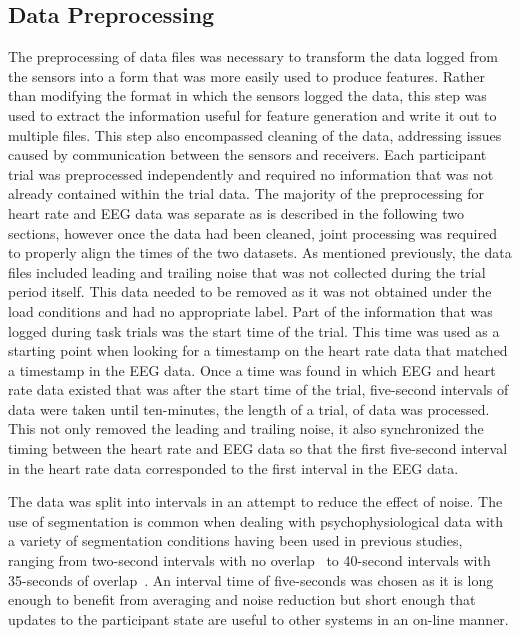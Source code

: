 \documentclass[11pt]{article}
\begin{document}
	\subsection{Data Preprocessing}
	The preprocessing of data files was necessary to transform the data logged from the sensors into a form that was more easily used to produce features. Rather than modifying the format in which the sensors logged the data, this step was used to extract the information useful for feature generation and write it out to multiple files. This step also encompassed cleaning of the data, addressing issues caused by communication between the sensors and receivers. Each participant trial was preprocessed independently and required no information that was not already contained within the trial data. The majority of the preprocessing for heart rate and EEG data was separate as is described in the following two sections, however once the data had been cleaned, joint processing was required to properly align the times of the two datasets. As mentioned previously, the data files included leading and trailing noise that was not collected during the trial period itself. This data needed to be removed as it was not obtained under the load conditions and had no appropriate label. Part of the information that was logged during task trials was the start time of the trial. This time was used as a starting point when looking for a timestamp on the heart rate data that matched a timestamp in the EEG data. Once a time was found in which EEG and heart rate data existed that was after the start time of the trial, five-second intervals of data were taken until ten-minutes, the length of a trial, of data was processed. This not only removed the leading and trailing noise, it also synchronized the timing between the heart rate and EEG data so that the first five-second interval in the heart rate data corresponded to the first interval in the EEG data.
	
	The data was split into intervals in an attempt to reduce the effect of noise. The use of segmentation is common when dealing with psychophysiological data with a variety of segmentation conditions having been used in previous studies, ranging from two-second intervals with no overlap~\cite{} to 40-second intervals with 35-seconds of overlap~\cite{}. An interval time of five-seconds was chosen as it is long enough to benefit from averaging and noise reduction but short enough that updates to the participant state are useful to other systems in an on-line manner.
	
\end{document}
